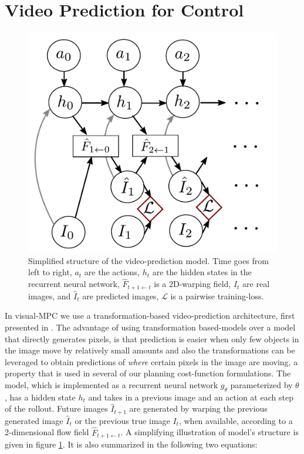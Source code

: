 \section{Video Prediction for Control}
\label{sec:model}

\begin{figure}[t]
	\centering
	\includegraphics[width=0.7\columnwidth]{images_general/prediction_model.pdf}
	\caption{\small{Simplified structure of the video-prediction model. Time goes from left to right, $a_t$ are the actions, $h_t$ are the hidden states in the recurrent neural network, $\hat{F}_{t+1 \leftarrow t}$ is a 2D-warping field, $I_t$ are real images, and $\hat{I}_t$ are predicted images, $\mathcal{L}$ is a pairwise training-loss.}}   
	\label{fig:prediction_model}
\end{figure}

In visual-MPC we use a transformation-based video-prediction architecture, first presented in \cite{finn_nips}. The advantage of using transformation based-models over a model that directly generates pixels, is that prediction is easier when only few objects in the image move by relatively small amounts and also the transformations can be leveraged to obtain predictions of \emph{where} certain pixels in the image are moving, a property that is used in several of our planning cost-function formulations. The model, which is implemented as a recurrent neural network $g_{\theta}$ parameterized by $\theta$, has a hidden state $h_t$ and takes in a previous image and an action at each step of the rollout. Future images $\hat{I}_{t+1}$ are generated by warping the previous generated image $\hat{I}_t$ or the previous true image $I_t$, when available, according to a 2-dimensional flow field $\hat{F}_{t+1 \leftarrow t}$. A simplifying illustration of model's structure is given in figure \ref{fig:prediction_model}. It is also summarized in the following two equations:

